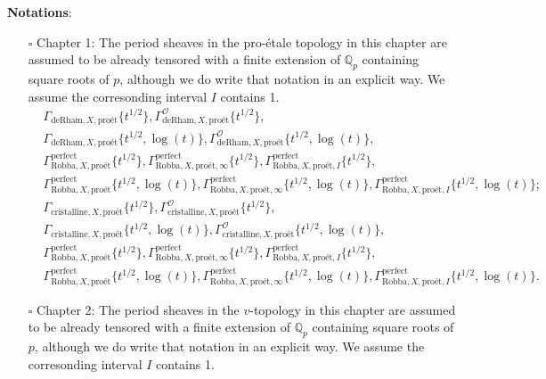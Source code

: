 \documentclass[12pt]{book}
\theoremstyle{definition}
\begin{document}
\newpage



\noindent \textbf{Notations}:
\begin{itemize}
\item[$\square$] Chapter 1: The period sheaves in the pro-\'etale topology in this chapter are assumed to be already tensored with a finite extension of $\mathbb{Q}_p$ containing square roots of $p$, although we do write that notation in an explicit way. We assume the corresonding interval $I$ contains 1. 
\begin{align}
&\Gamma_{\text{deRham},X,\text{pro\'et}}\{t^{1/2}\},\Gamma^\mathcal{O}_{\text{deRham},X,\text{pro\'et}}\{t^{1/2}\},\\
&\Gamma_{\text{deRham},X,\text{pro\'et}}\{t^{1/2},\log(t)\},\Gamma^\mathcal{O}_{\text{deRham},X,\text{pro\'et}}\{t^{1/2},\log(t)\},\\
&\Gamma^\mathrm{perfect}_{\text{Robba},X,\text{pro\'et}}\{t^{1/2}\},\Gamma^\mathrm{perfect}_{\text{Robba},X,\text{pro\'et},\infty}\{t^{1/2}\},\Gamma^\mathrm{perfect}_{\text{Robba},X,\text{pro\'et},I}\{t^{1/2}\},\\
&\Gamma^\mathrm{perfect}_{\text{Robba},X,\text{pro\'et}}\{t^{1/2},\log(t)\},\Gamma^\mathrm{perfect}_{\text{Robba},X,\text{pro\'et},\infty}\{t^{1/2},\log(t)\},\Gamma^\mathrm{perfect}_{\text{Robba},X,\text{pro\'et},I}\{t^{1/2},\log(t)\};
\end{align} 
\begin{align}
&\Gamma_{\text{cristalline},X,\text{pro\'et}}\{t^{1/2}\},\Gamma^\mathcal{O}_{\text{cristalline},X,\text{pro\'et}}\{t^{1/2}\},\\
&\Gamma_{\text{cristalline},X,\text{pro\'et}}\{t^{1/2},\log(t)\},\Gamma^\mathcal{O}_{\text{cristalline},X,\text{pro\'et}}\{t^{1/2},\log(t)\},\\
&\Gamma^\mathrm{perfect}_{\text{Robba},X,\text{pro\'et}}\{t^{1/2}\},\Gamma^\mathrm{perfect}_{\text{Robba},X,\text{pro\'et},\infty}\{t^{1/2}\},\Gamma^\mathrm{perfect}_{\text{Robba},X,\text{pro\'et},I}\{t^{1/2}\},\\
&\Gamma^\mathrm{perfect}_{\text{Robba},X,\text{pro\'et}}\{t^{1/2},\log(t)\},\Gamma^\mathrm{perfect}_{\text{Robba},X,\text{pro\'et},\infty}\{t^{1/2},\log(t)\},\Gamma^\mathrm{perfect}_{\text{Robba},X,\text{pro\'et},I}\{t^{1/2},\log(t)\}.
\end{align}
\item[$\square$] Chapter 2: The period sheaves in the $v$-topology in this chapter are assumed to be already tensored with a finite extension of $\mathbb{Q}_p$ containing square roots of $p$, although we do write that notation in an explicit way. We assume the corresonding interval $I$ contains 1.

\end{itemize}
\end{document}
